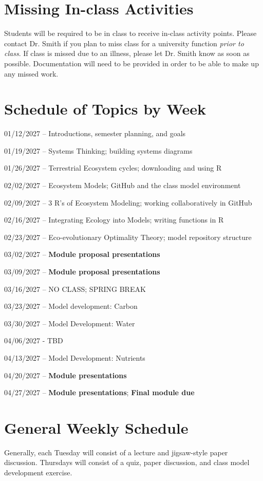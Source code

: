 \documentclass[12pt, notitlepage]{article}   	%
\begin{document}
{\section{Missing In-class Activities}
Students will be required to be in class to receive in-class activity points. 
Please contact Dr. Smith if you plan to miss class for a university function 
\textit{prior to class}. If class is missed due to an illness, 
please let Dr. Smith know as soon as possible. Documentation will need to be provided
in order to be able to make up any missed work.

\newpage

\section*{Schedule of Topics by Week}
01/12/2027 – Introductions, semester planning, and goals \par
01/19/2027 – Systems Thinking; building systems diagrams \par
01/26/2027 – Terrestrial Ecosystem cycles; downloading and using R \par
02/02/2027 – Ecosystem Models; GitHub and the class model environment \par
02/09/2027 – 3 R's of Ecosystem Modeling; working collaboratively in GitHub \par
02/16/2027 – Integrating Ecology into Models; writing functions in R \par
02/23/2027 – Eco-evolutionary Optimality Theory; model repository structure \par
03/02/2027 – \textbf{Module proposal presentations} \par
03/09/2027 – \textbf{Module proposal presentations} \par
03/16/2027 – NO CLASS; SPRING BREAK \par
03/23/2027 – Model development: Carbon \par
03/30/2027 – Model Development: Water \par
04/06/2027 - TBD \par
04/13/2027 – Model Development: Nutrients \par
04/20/2027 – \textbf{Module presentations} \par
04/27/2027 – \textbf{Module presentations}; \textbf{Final module due} \par

\section*{General Weekly Schedule}
Generally, each Tuesday will consist of a lecture and jigsaw-style paper discussion. Thursdays
will consist of a quiz, paper discussion, and class model development exercise.

} %
\end{document}
